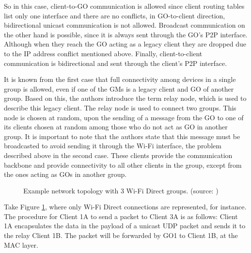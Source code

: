 So in this case, client-to-\gls{GO} communication is allowed since client routing tables list only one interface and there are no conflicts, in \gls{GO}-to-client direction, bidirectional unicast communication is not allowed. Broadcast communication on the other hand is possible, since it is always sent through the \gls{GO}'s P2P interface. Although when they reach the \gls{GO} acting as a legacy client they are dropped due to the \gls{IP} address conflict mentioned above. Finally, client-to-client communication is bidirectional and sent through the client's P2P interface.

It is known from the first case that full connectivity among devices in a single group is allowed, even if one of the \glspl{GM} is a legacy client and \gls{GO} of another group. Based on this, the authors introduce the term relay node, which is used to describe this legacy client. The relay node is used to connect two groups. This node is chosen at random, upon the sending of a message from the \gls{GO} to one of its clients  chosen at random among those who do not act as \gls{GO} in another group. It is important to note that the authors state that this message must be broadcasted to avoid sending it through the Wi-Fi interface, the problem described above in the second case. These clients provide the communication backbone and provide connectivity to all other clients in the group, except from the ones acting as \glspl{GO} in another group.

\begin{figure}[ht]
	\noindent{}
	\caption{\label{fig:1o1routing} Example network topology with 3 Wi-Fi Direct groups. (source: \cite{routeMultiGroup})}
\end{figure}

Take Figure \ref{fig:1o1routing}, where only Wi-Fi Direct connections are represented, for instance. The procedure for Client 1A to send a packet to Client 3A is as follows: Client 1A encapsulates the data in the payload of a unicast \gls{UDP} packet and sends it to the relay Client 1B. The packet will be forwarded by GO1 to Client 1B, at the \gls{MAC} layer.

